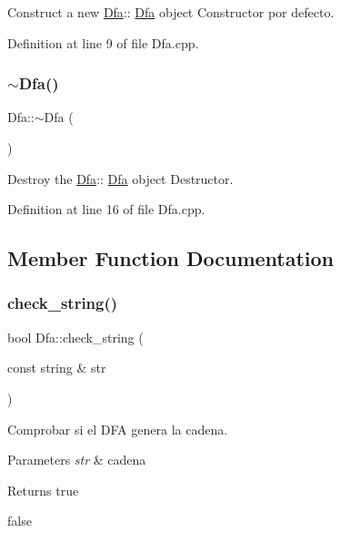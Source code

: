 Construct a new \hyperlink{class_dfa}{Dfa}\+:\+: \hyperlink{class_dfa}{Dfa} object Constructor por defecto. 



Definition at line 9 of file Dfa.\+cpp.

\mbox{\label{class_dfa_a2d110a2cc46b2dab6e6f9e901639b0cd}} 
\subsubsection{\texorpdfstring{$\sim$\+Dfa()}{~Dfa()}}
{\footnotesize\ttfamily Dfa\+::$\sim$\+Dfa (\begin{DoxyParamCaption}{ }\end{DoxyParamCaption})}



Destroy the \hyperlink{class_dfa}{Dfa}\+:\+: \hyperlink{class_dfa}{Dfa} object Destructor. 



Definition at line 16 of file Dfa.\+cpp.



\subsection{Member Function Documentation}
\mbox{\label{class_dfa_a0dd99d06e33e16c8fd342af4dbba3551}} 
\subsubsection{\texorpdfstring{check\+\_\+string()}{check\_string()}}
{\footnotesize\ttfamily bool Dfa\+::check\+\_\+string (\begin{DoxyParamCaption}\item[{const string \&}]{str }\end{DoxyParamCaption})}



Comprobar si el D\+FA genera la cadena. 


\begin{DoxyParams}{Parameters}
{\em str} & cadena \\
\hline
\end{DoxyParams}
\begin{DoxyReturn}{Returns}
true 

false 
\end{DoxyReturn}


